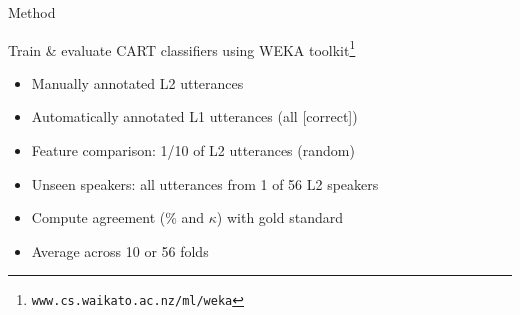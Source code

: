 \documentclass[xcolor={dvipsnames}]{beamer}
\begin{document}
\begin{frame}{Method}
		
		Train \& evaluate CART classifiers using WEKA toolkit\footnote{\texttt{www.cs.waikato.ac.nz/ml/weka}}
		
		\vfill
		
		\begin{itemize}
			\item Manually annotated L2 utterances
			\item Automatically annotated L1 utterances (all [correct])
		\end{itemize}				
		
		\vfill
		
		\begin{itemize}
			\item{Feature comparison: 1/10 of L2 utterances (random)}
			\item{Unseen speakers: all utterances from 1 of 56 L2 speakers}
		\end{itemize}
		
		\vfill
		
		\begin{itemize}
			\item Compute agreement (\% and $\kappa$) with gold standard
			\item Average across 10 or 56 folds
		\end{itemize}
		
		
		\end{frame}
		
\end{document}
